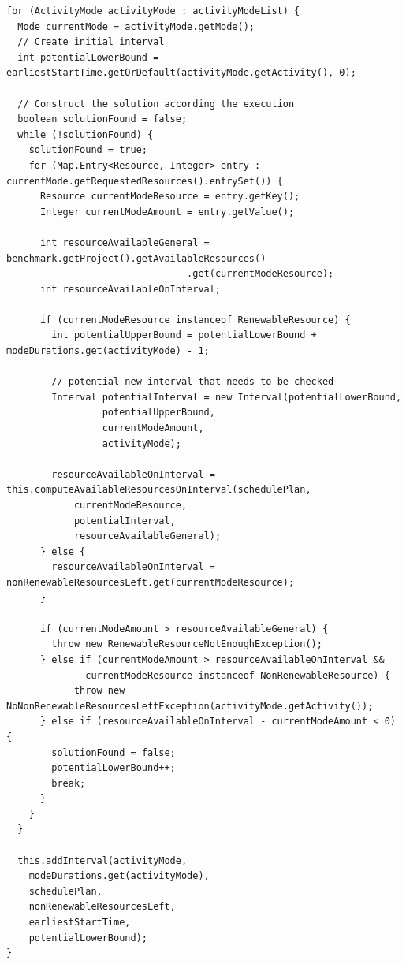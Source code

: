 \begin{lstlisting}[caption={Erzeugen von Zeitplänen anhand von Aktivitäts- und Moduslisten}, label=lst:scheduler_forward, mathescape=truexinputencoding={utf8}, extendedchars=false, escapeinside=``, basicstyle=\scriptsize]
for (ActivityMode activityMode : activityModeList) {
  Mode currentMode = activityMode.getMode();
  // Create initial interval
  int potentialLowerBound = earliestStartTime.getOrDefault(activityMode.getActivity(), 0);

  // Construct the solution according the execution
  boolean solutionFound = false;
  while (!solutionFound) {
    solutionFound = true;
    for (Map.Entry<Resource, Integer> entry : currentMode.getRequestedResources().entrySet()) {
      Resource currentModeResource = entry.getKey();
      Integer currentModeAmount = entry.getValue();
      
      int resourceAvailableGeneral = benchmark.getProject().getAvailableResources()
                                .get(currentModeResource);
      int resourceAvailableOnInterval;
      
      if (currentModeResource instanceof RenewableResource) {
        int potentialUpperBound = potentialLowerBound + modeDurations.get(activityMode) - 1;

        // potential new interval that needs to be checked
        Interval potentialInterval = new Interval(potentialLowerBound,
                 potentialUpperBound,
                 currentModeAmount,
                 activityMode);

        resourceAvailableOnInterval = this.computeAvailableResourcesOnInterval(schedulePlan,
            currentModeResource, 
            potentialInterval, 
            resourceAvailableGeneral);
      } else {
        resourceAvailableOnInterval = nonRenewableResourcesLeft.get(currentModeResource);
      }

      if (currentModeAmount > resourceAvailableGeneral) {
        throw new RenewableResourceNotEnoughException();
      } else if (currentModeAmount > resourceAvailableOnInterval &&
              currentModeResource instanceof NonRenewableResource) {
            throw new NoNonRenewableResourcesLeftException(activityMode.getActivity());
      } else if (resourceAvailableOnInterval - currentModeAmount < 0) {
        solutionFound = false;
        potentialLowerBound++;
        break;
      }
    }
  }
  
  this.addInterval(activityMode,
    modeDurations.get(activityMode), 
    schedulePlan, 
    nonRenewableResourcesLeft, 
    earliestStartTime, 
    potentialLowerBound);
}
\end{lstlisting}

